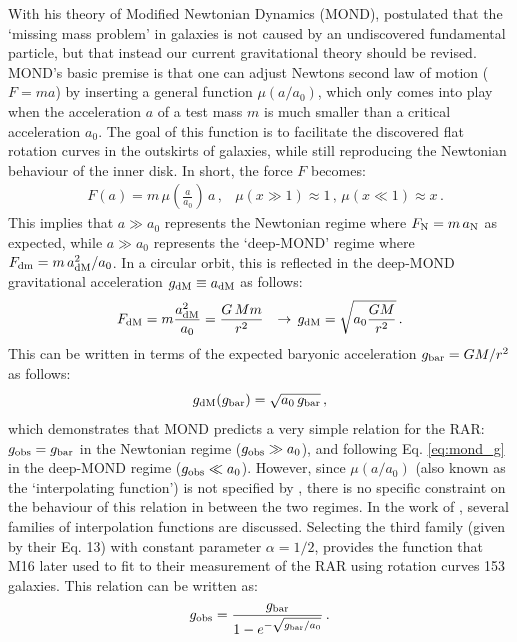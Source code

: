 \documentclass[usenatbib]{mnras}
\newcommand{\un}[1]{_{\rm #1}}
\begin{document}
With his theory of Modified Newtonian Dynamics (MOND), \cite{milgrom1983} postulated that the `missing mass problem' in galaxies is not caused by an undiscovered fundamental particle, but that instead our current gravitational theory should be revised. MOND's basic premise is that one can adjust Newtons second law of motion ($F=ma$) by inserting a general function $\mu(a/a_0)$, which only comes into play when the acceleration $a$ of a test mass $m$ is much smaller than a critical acceleration $a_0$. The goal of this function is to facilitate the discovered flat rotation curves in the outskirts of galaxies, while still reproducing the Newtonian behaviour of the inner disk. In short, the force $F$ becomes:
\begin{align}\label{eq:mond_f}
	& F(a) = m \, \mu(\frac{a}{a_0}) \, a \, ,
	& \mu(x \gg 1) \approx 1 \, , \, \mu(x \ll 1) \approx x \, .
\end{align}
This implies that $a\gg a_0$ represents the Newtonian regime where $F\un{N} = m \, a\un{N}$ as expected, while $a\gg a_0$ represents the `deep-MOND' regime where $F\un{dm}=m \, a\un{dM}^2/a_0$. In a circular orbit, this is reflected in the deep-MOND gravitational acceleration $g\un{dM} \equiv a\un{dM}$ as follows:
\begin{align}\label{eq:mond_g}
	& F\un{dM} = m \frac{a\un{dM}^2}{a_0} = \frac{G \, M m}{r^2}
	& \rightarrow \,  g\un{dM} = \sqrt{a_0 \frac{G M}{r^2}} \, .
\end{align}
This can be written in terms of the expected baryonic acceleration $g\un{bar}=GM/r^2$ as follows:
\begin{equation}
	g\un{dM}(g\un{bar}) = \sqrt{a_0 \, g\un{bar}} \, ,
\end{equation}
which demonstrates that MOND predicts a very simple relation for the RAR: $g\un{obs}=g\un{bar}$ in the Newtonian regime ($g\un{obs}\gg a_0$), and following Eq. \ref{eq:mond_g} in the deep-MOND regime ($g\un{obs}\ll a_0$). However, since $\mu(a/a_0)$ (also known as the `interpolating function') is not specified by \cite{milgrom1983}, there is no specific constraint on the behaviour of this relation in between the two regimes. In the work of \cite{milgrom2008}, several families of interpolation functions are discussed. Selecting the third family (given by their Eq. 13) with constant parameter $\alpha=1/2$, provides the function that M16 later used to fit to their measurement of the RAR using rotation curves 153 galaxies. This relation can be written as:
\begin{equation}\label{eq:mcgaugh}
	g\un{obs} = \frac{g\un{bar}}{1 - e^{-\sqrt{g\un{bar}/a_0}}} \, .
\end{equation}
\end{document}
